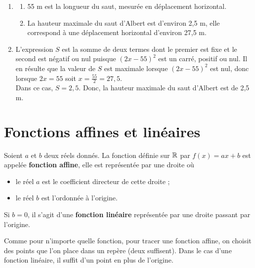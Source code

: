 \begin{exemple*1}
\begin{enumerate}
   \item
   \begin{enumerate}
      \item  55 m est la longueur du saut, mesurée en déplacement horizontal.
      \item La hauteur maximale du saut d'Albert est d'environ 2,5 m, elle correspond à une déplacement horizontal d'environ 27,5 m.
   \end{enumerate}
   \item L'expression $S$ est la somme de deux termes dont le premier est fixe et le second est négatif ou nul puisque $(2x -55)^2$ est un carré, positif ou nul. Il en résulte que la valeur de $S$ est maximale lorsque  $(2x -55)^2$ est nul, donc lorsque $2x =55$ soit $x =\frac{55}{2} =27,5$. \\
   Dans ce cas, $S =2,5$. Donc, la hauteur maximale du saut d'Albert est de 2,5 m. \\ [-10mm]
\end{enumerate}
\end{exemple*1}  


\section{Fonctions affines et linéaires} %

\begin{definition}
   Soient $a$ et $b$ deux réels donnés. La fonction définie sur ${\mathbb R}$ par $f(x)=ax+b$ est appelée \textbf{fonction affine}, elle est représentée par une droite où
   \begin{itemize}
      \item le réel $a$ est le coefficient directeur de cette droite ;
      \item le réel $b$ est l'ordonnée à l'origine.
   \end{itemize}
   Si $b=0$, il s'agit d'une \textbf{fonction linéaire} représentée par une droite passant par l'origine.
\end{definition}

\smallskip

Comme pour n'importe quelle fonction, pour tracer une fonction affine, on choisit des points que l'on place dans un repère (deux suffisent). Dans le cas d'une fonction linéaire, il suffit d'un point en plus de l'origine.

